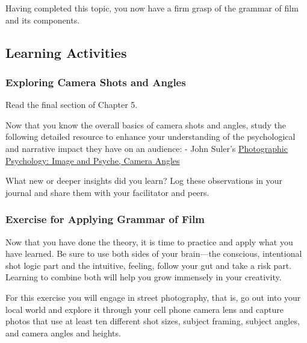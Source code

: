 \documentclass[
]{book}
\begin{document}
Having completed this topic, you now have a firm grasp of the grammar of film and its components.

\hypertarget{learning-activities-17}{%
\subsection*{Learning Activities}\label{learning-activities-17}}

\begin{reflect}
\hypertarget{exploring-camera-shots-and-angles}{%
\subsubsection*{Exploring Camera Shots and Angles}\label{exploring-camera-shots-and-angles}}

Read the final section of Chapter 5.

Now that you know the overall basics of camera shots and angles, study the following detailed resource to enhance your understanding of the psychological and narrative impact they have on an audience:
- John Suler's \href{http://truecenterpublishing.com/photopsy/camera_angles.htm}{Photographic Psychology: Image and Psyche, Camera Angles}

What new or deeper insights did you learn? Log these observations in your journal and share them with your facilitator and peers.

\hypertarget{exercise-for-applying-grammar-of-film}{%
\subsubsection*{Exercise for Applying Grammar of Film}\label{exercise-for-applying-grammar-of-film}}

Now that you have done the theory, it is time to practice and apply what you have learned. Be sure to use both sides of your brain---the conscious, intentional shot logic part and the intuitive, feeling, follow your gut and take a risk part. Learning to combine both will help you grow immensely in your creativity.

For this exercise you will engage in street photography, that is, go out into your local world and explore it through your cell phone camera lens and capture photos that use at least ten different shot sizes, subject framing, subject angles, and camera angles and heights.


\end{reflect}
\end{document}
